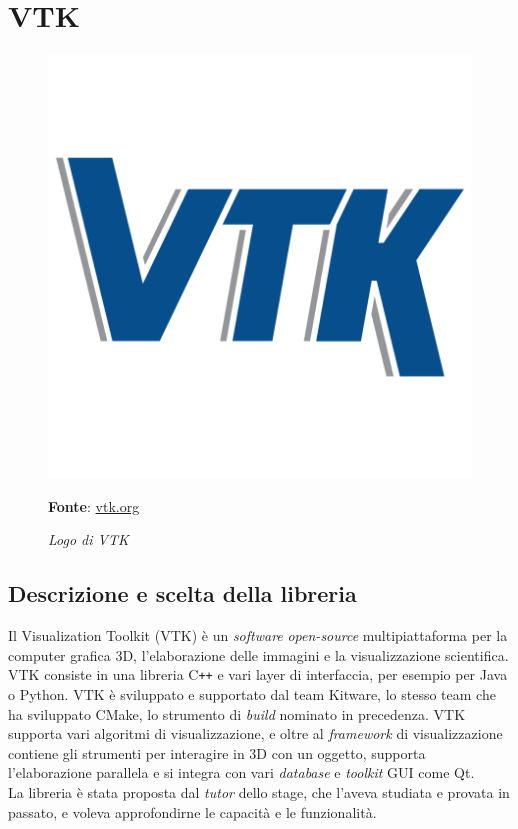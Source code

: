\section{VTK}

\begin{figure}[h]
    \centering
    \includegraphics[scale=0.1]{immagini/volumerendering/VTK_logo.png}
    \caption{\textit{Logo di VTK}}
    \textbf{Fonte}: \href{https://vtk.org/}{vtk.org}
    \label{fig: Logo VTK}
\end{figure}

\subsection{Descrizione e scelta della libreria}\label{sec:scelta-liberia}
Il Visualization Toolkit (VTK) è un \emph{software} \emph{open-source} multipiattaforma per la computer grafica 3D, l'elaborazione delle immagini e la visualizzazione scientifica. VTK consiste in una libreria C\texttt{++} e vari layer di interfaccia, per esempio per Java o Python. VTK è sviluppato e supportato dal team Kitware, lo stesso team che ha sviluppato CMake, lo strumento di \emph{build} nominato in precedenza. VTK supporta vari algoritmi di visualizzazione, e oltre al \emph{framework} di visualizzazione contiene gli strumenti per interagire in 3D con un oggetto, supporta l'elaborazione parallela e si integra con vari \emph{database} e \emph{toolkit} GUI come Qt.
\\
La libreria è stata proposta dal \emph{tutor} dello stage, che l'aveva studiata e provata in passato, e voleva approfondirne le capacità e le funzionalità.

